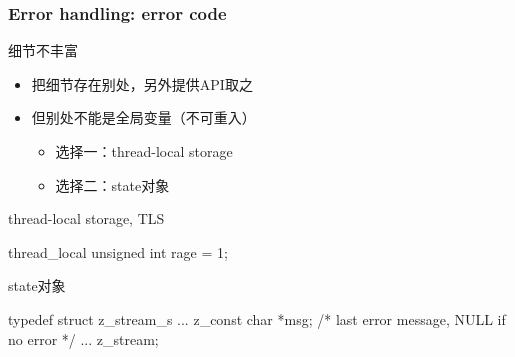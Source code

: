 \documentclass[UTF8,lualatex]{ctexbeamer}
\begin{document}

\begin{frame}[fragile]
    \frametitle{Error handling: error code}
    \begin{block}{细节不丰富}
        \begin{itemize}
            \item 把细节存在别处，另外提供API取之
            \item 但别处不能是全局变量（不可重入）
                \begin{itemize}
                    \item 选择一：thread-local storage
                    \item 选择二：state对象
                \end{itemize}
        \end{itemize}
    \end{block}
    \begin{exampleblock}{thread-local storage, TLS}
        \footnotesize
        \begin{cppcode}
            thread_local unsigned int rage = 1;
        \end{cppcode}
    \end{exampleblock}
    \begin{exampleblock}{state对象}
        \footnotesize
        \begin{cppcode}
            typedef struct z_stream_s {
                ...
                z_const char *msg;  /* last error message, NULL if no error */
                ...
            } z_stream;
        \end{cppcode}
    \end{exampleblock}
\end{frame}
\end{document}
